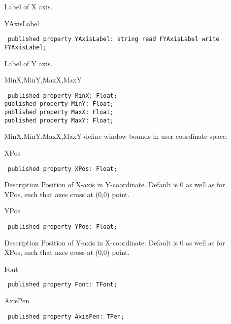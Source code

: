 \documentclass[12pt,a4paper,oneside]{report}
\newcommand{\declarationitem}[1]{{\addfontfeatures{FakeBold=1.3} #1}}
\newcommand{\descriptiontitle}[1]{{\addfontfeatures{FakeSlant}#1}}
\newcommand{\code}[1]{\texttt{#1}}
\begin{document}
\begin{itemize}
Label of X axis.
\item[\declarationitem{YAxisLabel}\hfill]
\begin{flushleft}
\code{
published property YAxisLabel: string read FYAxisLabel write FYAxisLabel;}
\end{flushleft}
\par Label of Y axis.  
\item[\declarationitem{MinX,MinY,MaxX,MaxY}\hfill]
\begin{flushleft}
\code{
published property MinX: Float;\\
published property MinY: Float;\\
published property MaxX: Float;\\
published property MaxY: Float;
}
\label{lmcoordsys.TCoordSys-MinX}
\end{flushleft}
 MinX,MinY,MaxX,MaxY define window bounds in user coordinate space.\label{lmcoordsys.TCoordSys-MinY}
\label{lmcoordsys.TCoordSys-XPos}
\item[\declarationitem{XPos}\hfill]
\begin{flushleft}
\code{
published property XPos: Float;}
\end{flushleft}
\label{lmcoordsys.TCoordSys-YPos}
\item[\descriptiontitle{Description}] Position of X-axis in Y-coordinate. Default is 0 as well as for YPos, such that axes cross at (0,0) point.
\item[\declarationitem{YPos}\hfill]
\begin{flushleft}
\code{
published property YPos: Float;}
\end{flushleft}
\item[\descriptiontitle{Description}] Position of Y-axis in X-coordinate. Default is 0 as well as for XPos, such that axes cross at (0,0) point.
\label{lmcoordsys.TCoordSys-Font}
\item[\declarationitem{Font}\hfill]
\begin{flushleft}
\code{
published property Font: TFont;}

\end{flushleft}


\par  \label{lmcoordsys.TCoordSys-AxisPen}
\item[\declarationitem{AxisPen}\hfill]
\begin{flushleft}
\code{
published property AxisPen: TPen;}
\end{flushleft}


\end{itemize}
\end{document}
